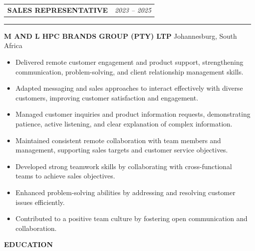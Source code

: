 \documentclass[11pt, a4paper]{article}
\newcommand{\cvsection}[1]{%
  \vspace{6pt}%
  \noindent%
  \colorbox{DKGreen}{\hspace{4pt}\rule{0pt}{14pt}\hspace{4pt}}%
  \colorbox{CardBG}{%
    \parbox[c][14pt]{\dimexpr\linewidth-16pt\relax}{%
      \hspace{8pt}\textcolor{DKGreen}{\textbf{\large\MakeUppercase{#1}}}%
    }%
  }%
  \par
  \noindent{\color{BorderClr}\rule{\linewidth}{0.6pt}}%
  \vspace{4pt}\par\noindent%
}
\begin{document}
\vspace{6pt}
\noindent
\begin{tabularx}{\linewidth}{Xr}
  \textcolor{DarkTxt}{\textbf{\large SALES REPRESENTATIVE}} &
  \textcolor{LiteTxt}{\textit{2023 -- 2025}} \\
\end{tabularx}%
{\color{DKGreen}\rule{\linewidth}{0.8pt}}%
\vspace{2pt}
\noindent\textcolor{MDGreen}{\textbf{M AND L HPC BRANDS GROUP (PTY) LTP}}\;%
\textcolor{LiteTxt}{\bullet\; Johannesburg, South Africa}
\vspace{3pt}
\begin{itemize}
  \item\textcolor{MidTxt}{Delivered remote customer engagement and product support, strengthening communication, problem-solving, and client relationship management skills.}
  \item\textcolor{MidTxt}{Adapted messaging and sales approaches to interact effectively with diverse customers, improving customer satisfaction and engagement.}
  \item\textcolor{MidTxt}{Managed customer inquiries and product information requests, demonstrating patience, active listening, and clear explanation of complex information.}
  \item\textcolor{MidTxt}{Maintained consistent remote collaboration with team members and management, supporting sales targets and customer service objectives.}
  \item\textcolor{MidTxt}{Developed strong teamwork skills by collaborating with cross-functional teams to achieve sales objectives.}
  \item\textcolor{MidTxt}{Enhanced problem-solving abilities by addressing and resolving customer issues efficiently.}
  \item\textcolor{MidTxt}{Contributed to a positive team culture by fostering open communication and collaboration.}
\end{itemize}
\vspace{2pt}

\newpage

\cvsection{Education}
\end{document}
